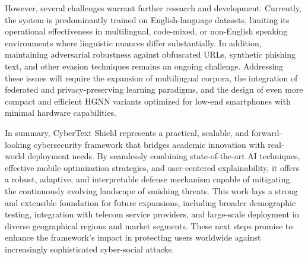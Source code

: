 \documentclass[conference]{IEEEtran}
\begin{document}
However, several challenges warrant further research and development. Currently, the system is predominantly trained on English-language datasets, limiting its operational effectiveness in multilingual, code-mixed, or non-English speaking environments where linguistic nuances differ substantially. In addition, maintaining adversarial robustness against obfuscated URLs, synthetic phishing text, and other evasion techniques remains an ongoing challenge. Addressing these issues will require the expansion of multilingual corpora, the integration of federated and privacy-preserving learning paradigms, and the design of even more compact and efficient HGNN variants optimized for low-end smartphones with minimal hardware capabilities.

In summary, CyberText Shield represents a practical, scalable, and forward-looking cybersecurity framework that bridges academic innovation with real-world deployment needs. By seamlessly combining state-of-the-art AI techniques, effective mobile optimization strategies, and user-centered explainability, it offers a robust, adaptive, and interpretable defense mechanism capable of mitigating the continuously evolving landscape of smishing threats. This work lays a strong and extensible foundation for future expansions, including broader demographic testing, integration with telecom service providers, and large-scale deployment in diverse geographical regions and market segments. These next steps promise to enhance the framework’s impact in protecting users worldwide against increasingly sophisticated cyber-social attacks.
\end{document}
